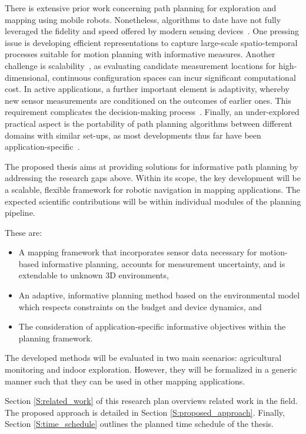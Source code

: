 There is extensive prior work concerning path planning for exploration and 
mapping using mobile robots. Nonetheless, algorithms to date have not fully leveraged the fidelity and speed 
offered by modern sensing devices~\cite{Alterovitz2015}. One pressing issue is developing efficient 
representations to capture 
large-scale spatio-temporal processes suitable for motion planning with informative measures. Another 
challenge is scalability~\cite{Hollinger2014}, as evaluating candidate measurement locations for 
high-dimensional, continuous configuration spaces can incur significant computational cost. In active 
applications, a further important element is adaptivity, whereby new sensor measurements are conditioned 
on the outcomes of earlier ones. This requirement complicates the decision-making process~\cite{Lim2015}. 
Finally, an under-explored practical aspect is the portability of path planning algorithms 
between different domains with similar set-ups, as most developments thus far have been 
application-specific~\cite{Dunbabin2012}.

The proposed thesis aims at providing solutions for informative path planning by addressing the research 
gaps above. Within its scope, the key development will be a scalable, flexible framework for robotic 
navigation in mapping applications. The expected scientific contributions will be within individual 
modules of the planning pipeline.

These are:

\begin{itemize}
 \item A mapping framework that incorporates sensor data necessary for motion-based informative 
planning, accounts for measurement uncertainty, and is extendable to unknown 3D environments,
 \item An adaptive, informative planning method based on the environmental model which respects constraints 
on the budget and device dynamics, and
 \item The consideration of application-specific informative objectives within the planning framework.
\end{itemize}

The developed methods will be evaluated in two main scenarios: agricultural monitoring and indoor 
exploration. However, they will be formalized in a generic manner such that they can be used in other 
mapping applications.

Section \ref{S:related_work} of this research plan overviews related work in the field. The proposed 
approach is detailed in Section \ref{S:proposed_approach}. Finally, 
Section \ref{S:time_schedule} outlines the planned time schedule of the thesis.